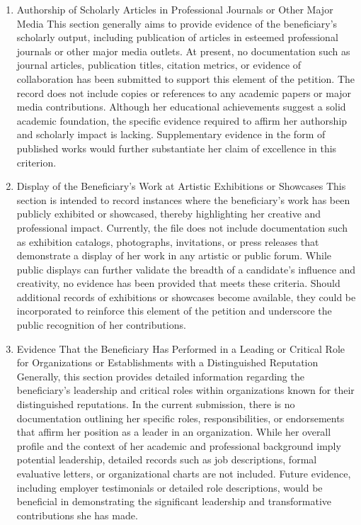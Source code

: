 \begin{enumerate}
\item Authorship of Scholarly Articles in Professional Journals or Other Major Media
This section generally aims to provide evidence of the beneficiary’s scholarly output, including publication of articles in esteemed professional journals or other major media outlets. At present, no documentation such as journal articles, publication titles, citation metrics, or evidence of collaboration has been submitted to support this element of the petition. The record does not include copies or references to any academic papers or major media contributions. Although her educational achievements suggest a solid academic foundation, the specific evidence required to affirm her authorship and scholarly impact is lacking. Supplementary evidence in the form of published works would further substantiate her claim of excellence in this criterion.

\item Display of the Beneficiary’s Work at Artistic Exhibitions or Showcases
This section is intended to record instances where the beneficiary’s work has been publicly exhibited or showcased, thereby highlighting her creative and professional impact. Currently, the file does not include documentation such as exhibition catalogs, photographs, invitations, or press releases that demonstrate a display of her work in any artistic or public forum. While public displays can further validate the breadth of a candidate’s influence and creativity, no evidence has been provided that meets these criteria. Should additional records of exhibitions or showcases become available, they could be incorporated to reinforce this element of the petition and underscore the public recognition of her contributions.

\item Evidence That the Beneficiary Has Performed in a Leading or Critical Role for Organizations or Establishments with a Distinguished Reputation
Generally, this section provides detailed information regarding the beneficiary’s leadership and critical roles within organizations known for their distinguished reputations. In the current submission, there is no documentation outlining her specific roles, responsibilities, or endorsements that affirm her position as a leader in an organization. While her overall profile and the context of her academic and professional background imply potential leadership, detailed records such as job descriptions, formal evaluative letters, or organizational charts are not included. Future evidence, including employer testimonials or detailed role descriptions, would be beneficial in demonstrating the significant leadership and transformative contributions she has made.


\end{enumerate}
